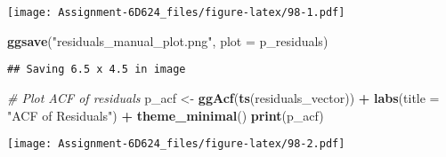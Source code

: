 \documentclass[
]{article}
\newenvironment{Shaded}{\begin{snugshade}}{\end{snugshade}}
\newcommand{\AttributeTok}[1]{\textcolor[rgb]{0.13,0.29,0.53}{#1}}
\newcommand{\CommentTok}[1]{\textcolor[rgb]{0.56,0.35,0.01}{\textit{#1}}}
\newcommand{\FunctionTok}[1]{\textcolor[rgb]{0.13,0.29,0.53}{\textbf{#1}}}
\newcommand{\NormalTok}[1]{#1}
\newcommand{\OtherTok}[1]{\textcolor[rgb]{0.56,0.35,0.01}{#1}}
\newcommand{\SpecialCharTok}[1]{\textcolor[rgb]{0.81,0.36,0.00}{\textbf{#1}}}
\newcommand{\StringTok}[1]{\textcolor[rgb]{0.31,0.60,0.02}{#1}}
\begin{document}
\begin{Shaded}
\end{Shaded}

\texttt{[image: Assignment-6D624\_files/figure-latex/98-1.pdf]}

\begin{Shaded}
\begin{Highlighting}[]
\FunctionTok{ggsave}\NormalTok{(}\StringTok{"residuals\_manual\_plot.png"}\NormalTok{, }\AttributeTok{plot =}\NormalTok{ p\_residuals)}
\end{Highlighting}
\end{Shaded}

\begin{verbatim}
## Saving 6.5 x 4.5 in image
\end{verbatim}

\begin{Shaded}
\begin{Highlighting}[]
\CommentTok{\# Plot ACF of residuals}
\NormalTok{p\_acf }\OtherTok{\textless{}{-}} \FunctionTok{ggAcf}\NormalTok{(}\FunctionTok{ts}\NormalTok{(residuals\_vector)) }\SpecialCharTok{+}
  \FunctionTok{labs}\NormalTok{(}\AttributeTok{title =} \StringTok{"ACF of Residuals"}\NormalTok{) }\SpecialCharTok{+}
  \FunctionTok{theme\_minimal}\NormalTok{()}
\FunctionTok{print}\NormalTok{(p\_acf)}
\end{Highlighting}
\end{Shaded}

\texttt{[image: Assignment-6D624\_files/figure-latex/98-2.pdf]}
\end{document}

